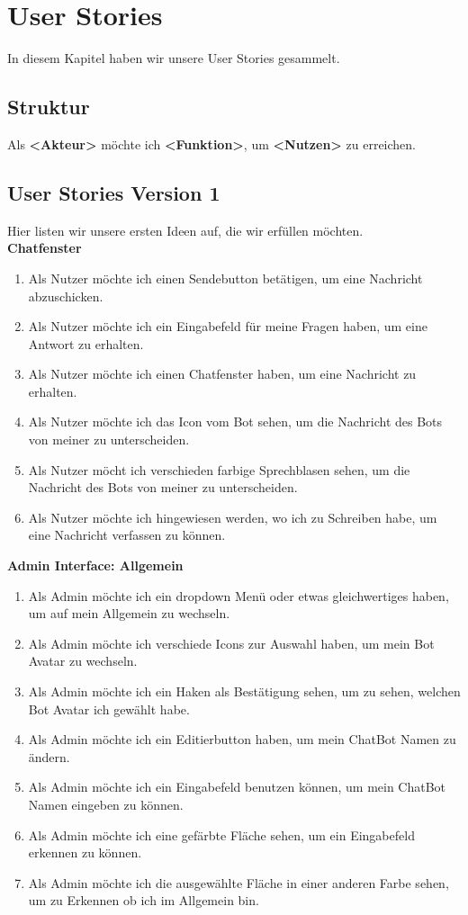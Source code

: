 \section{User Stories}
In diesem Kapitel haben wir unsere User Stories gesammelt.

\subsection{Struktur}
Als \textbf{<Akteur>} möchte ich \textbf{<Funktion>}, um \textbf{<Nutzen>} zu erreichen.
\subsection{User Stories Version 1}
Hier listen wir unsere ersten Ideen auf, die wir erfüllen möchten.
\\

\textbf{Chatfenster}
\begin{enumerate}
    \item Als Nutzer möchte ich einen Sendebutton betätigen, um eine Nachricht abzuschicken. 
    \item Als Nutzer möchte ich ein Eingabefeld für meine Fragen haben, um eine Antwort zu erhalten.
    \item Als Nutzer möchte ich einen Chatfenster haben, um eine Nachricht zu erhalten. 
    \item Als Nutzer möchte ich das Icon vom Bot sehen, um die Nachricht des Bots von meiner zu unterscheiden. 
    \item Als Nutzer möcht ich verschieden farbige Sprechblasen sehen, um die Nachricht des Bots von meiner zu unterscheiden. 
    \item Als Nutzer möchte ich hingewiesen werden, wo ich zu Schreiben habe, um eine Nachricht verfassen zu können. 
\end{enumerate}

\textbf{Admin Interface: Allgemein}
\begin{enumerate}
    \item Als Admin möchte ich ein dropdown Menü oder etwas gleichwertiges haben, um auf mein Allgemein zu wechseln. 
    \item Als Admin möchte ich verschiede Icons zur Auswahl haben, um mein Bot Avatar zu wechseln. 
    \item Als Admin möchte ich ein Haken als Bestätigung sehen, um zu sehen, welchen Bot Avatar ich gewählt habe. 
    \item Als Admin möchte ich ein Editierbutton haben, um mein ChatBot Namen zu ändern. 
    \item Als Admin möchte ich ein Eingabefeld benutzen können, um mein ChatBot Namen eingeben zu können. 
    \item Als Admin möchte ich eine gefärbte Fläche sehen, um ein Eingabefeld erkennen zu können. 
    \item Als Admin möchte ich die ausgewählte Fläche in einer anderen Farbe sehen, um zu Erkennen ob ich im Allgemein bin. 
\end{enumerate}

